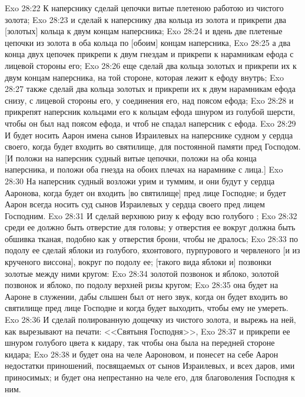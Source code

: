 \vs Exo 28:22 К наперснику сделай цепочки витые плетеною работою из чистого золота;
\vs Exo 28:23 и сделай к наперснику два кольца из золота и прикрепи два [золотых] кольца к двум концам наперсника;
\vs Exo 28:24 и вдень две плетеные цепочки из золота в оба кольца по [обоим] концам наперсника,
\vs Exo 28:25 а два конца двух цепочек прикрепи к двум гнездам и прикрепи к нарамникам ефода с лицевой стороны его;
\vs Exo 28:26 еще сделай два кольца золотых и прикрепи их к двум  концам наперсника, на той стороне, которая лежит к ефоду внутрь;
\vs Exo 28:27 также сделай два кольца золотых и прикрепи их к двум нарамникам ефода снизу, с лицевой стороны его, у соединения его, над поясом ефода;
\vs Exo 28:28 и прикрепят наперсник кольцами его к кольцам ефода шнуром из голубой шерсти, чтобы он был над поясом ефода, и чтоб не спадал наперсник с ефода.
\vs Exo 28:29 И будет носить Аарон имена сынов Израилевых на наперснике судном у сердца своего, когда будет входить во святилище, для постоянной памяти пред Господом. [И положи на наперсник судный витые цепочки, положи на оба конца наперсника, и положи оба гнезда на обоих плечах на нарамнике с лица.]
\vs Exo 28:30 На наперсник судный возложи урим и туммим, и они будут у сердца Ааронова, когда будет он входить [во святилище] пред лице Господне; и будет Аарон всегда носить суд сынов Израилевых у сердца своего пред лицем Господним.
\rsbpar\vs Exo 28:31 И сделай верхнюю ризу к ефоду всю голубого ;
\vs Exo 28:32 среди ее должно быть отверстие для головы; у отверстия ее вокруг должна быть обшивка тканая, подобно как у отверстия брони, чтобы не дралось;
\vs Exo 28:33 по подолу ее сделай яблоки из  голубого, яхонтового, пурпурового и червленого  [и из крученого виссона], вокруг по подолу ее; [такого вида яблоки и] позвонки золотые между ними кругом:
\vs Exo 28:34 золотой позвонок и яблоко, золотой позвонок и яблоко, по подолу верхней ризы кругом;
\vs Exo 28:35 она будет на Аароне в служении, дабы слышен был от него звук, когда он будет входить во святилище пред лице Господне и когда будет выходить, чтобы ему не умереть.
\rsbpar\vs Exo 28:36 И сделай полированную дощечку из чистого золота, и вырежь на ней, как вырезывают на печати: <<Святыня Господня>>,
\vs Exo 28:37 и прикрепи ее шнуром голубого цвета к кидару, так чтобы она была на передней стороне кидара;
\vs Exo 28:38 и будет она на челе Аароновом, и понесет на себе Аарон недостатки приношений, посвящаемых от сынов Израилевых, и всех даров, ими приносимых; и будет она непрестанно на челе его, для благоволения Господня к ним.

